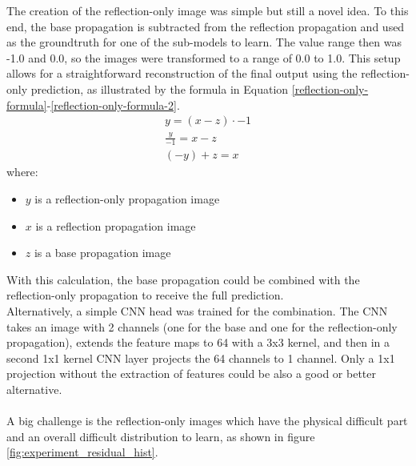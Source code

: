 		The creation of the reflection-only image was simple but still a novel idea. To this end, the base propagation is subtracted from the reflection propagation and used as the groundtruth for one of the sub-models to learn. The value range then was -1.0 and 0.0, so the images were transformed to a range of 0.0 to 1.0. This setup allows for a straightforward reconstruction of the final output using the reflection-only prediction, as illustrated by the formula in Equation \ref{reflection-only-formula}-\ref{reflection-only-formula-2}.
		\clearpage
		\begin{align}  %
			\label{reflection-only-formula}
			y = (x - z) \cdot -1 \\
			\frac{y}{-1} = x - z \\
			\label{reflection-only-formula-2}
			\left(-y \right) + z = x
		\end{align}
		\noindent where:
		\begin{itemize}[itemsep=1mm, parsep=0pt]
			\item $y$ is a reflection-only propagation image
			\item $x$ is a reflection propagation image
			\item $z$ is a base propagation image
		\end{itemize}
		\vspace{10mm}
		With this calculation, the base propagation could be combined with the reflection-only propagation to receive the full prediction.\\
		Alternatively, a simple CNN head was trained for the combination. The CNN takes an image with 2 channels (one for the base and one for the reflection-only propagation), extends the feature maps to 64 with a 3x3 kernel, and then in a second 1x1 kernel CNN layer projects the 64 channels to 1 channel. Only a 1x1 projection without the extraction of features could be also a good or better alternative.\\
		\\
		A big challenge is the reflection-only images which have the physical difficult part and an overall difficult distribution to learn, as shown in figure \ref{fig:experiment_residual_hist}. 
		
